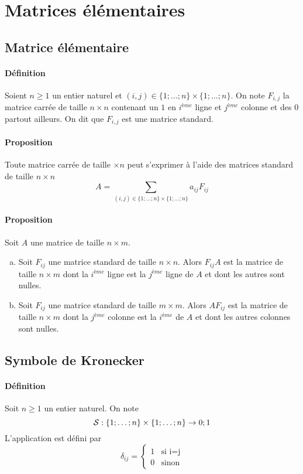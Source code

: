 %
%
\section{Matrices élémentaires}
%
%

%
\subsection{Matrice élémentaire}
%
\paragraph{Définition} Soient $n \geq 1$ un entier naturel et $(i, j) \in \{1; \ldots; n\} \times \{1; \ldots; n\}$. On note $F_{i, j}$ la matrice carrée de taille $n \times n$ contenant un $1$ en $i^{ème}$ ligne et $j^{ème}$ colonne et des $0$ partout ailleurs. On dit que $F_{i, j}$ est une matrice standard.

\paragraph{Proposition} Toute matrice carrée de taille $\times n$ peut s'exprimer à l'aide des matrices standard de taille $n\times n$
$$A = \sum_{(i, j) \in \{1; \ldots; n\}\times\{1; \ldots; n\}} a_{ij} F_{ij}$$

\paragraph{Proposition} Soit $A$ une matrice de taille $n\times m$.
\begin{enumerate}[a)]
  \item Soit $F_{ij}$ une matrice standard de taille $n\times n$. Alors $F_{ij} A$ est la matrice de taille $n \times m$ dont la $i^{ème}$ ligne est la $j^{ème}$ ligne de $A$ et dont les autres sont nulles.
  \item Soit $F_{ij}$ une matrice standard de taille $m\times m$. Alors $A F_{ij}$ est la matrice de taille $n\times m$ dont la $j^{ème}$ colonne est la $i^{ème}$ de $A$ et dont les autres colonnes sont nulles.
\end{enumerate}

%
\subsection{Symbole de Kronecker}
%
\paragraph{Définition} Soit $n \geq 1$ un entier naturel. On note
$$\mathcal{S}: \{1; \ldots; n\}\times\{1; \ldots; n \} \rightarrow {0; 1}$$
L'application est défini par
$$\delta_{ij} = \left\{\begin{array}{lr} 1 & \text{si i=j} \\ 0 & \text{sinon} \end{array} \right.$$ 

